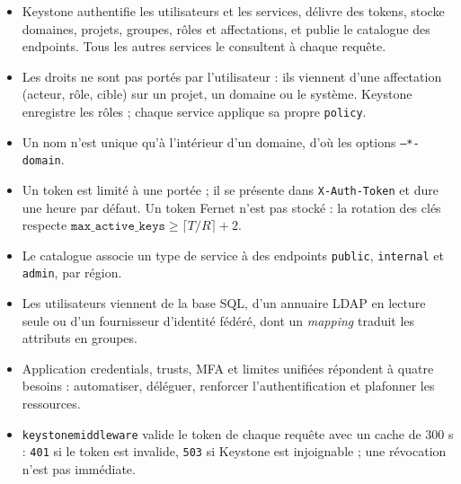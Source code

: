 \begin{aretenir}
\begin{itemize}
  \item Keystone authentifie les utilisateurs et les services, délivre des tokens, stocke domaines, projets, groupes, rôles et
        affectations, et publie le catalogue des endpoints. Tous les autres services le consultent à chaque requête.
  \item Les droits ne sont pas portés par l'utilisateur : ils viennent d'une affectation (acteur, rôle, cible) sur un projet, un
        domaine ou le système. Keystone enregistre les rôles ; chaque service applique sa propre \texttt{policy}.
  \item Un nom n'est unique qu'à l'intérieur d'un domaine, d'où les options \texttt{--*-domain}.
  \item Un token est limité à une portée ; il se présente dans \texttt{X-Auth-Token} et dure une heure par défaut. Un token Fernet n'est
        pas stocké : la rotation des clés respecte $\texttt{max\_active\_keys}\ge\lceil T/R\rceil+2$.
  \item Le catalogue associe un type de service à des endpoints \texttt{public}, \texttt{internal} et \texttt{admin}, par région.
  \item Les utilisateurs viennent de la base SQL, d'un annuaire LDAP en lecture seule ou d'un fournisseur d'identité fédéré, dont un
        \emph{mapping} traduit les attributs en groupes.
  \item Application credentials, trusts, MFA et limites unifiées répondent à quatre besoins : automatiser, déléguer, renforcer
        l'authentification et plafonner les ressources.
  \item \texttt{keystonemiddleware} valide le token de chaque requête avec un cache de 300 s : \texttt{401} si le token est
        invalide, \texttt{503} si Keystone est injoignable ; une révocation n'est pas immédiate.
\end{itemize}
\end{aretenir}

